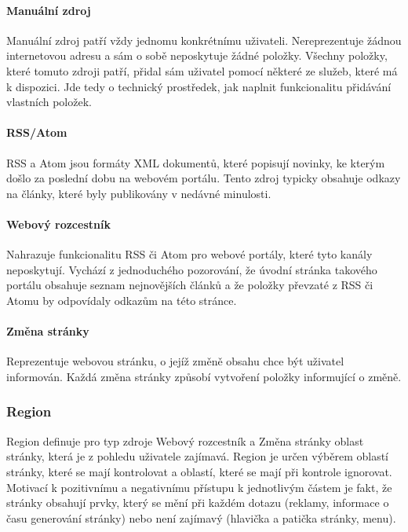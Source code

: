 \paragraph{Manuální zdroj}

Manuální zdroj patří vždy jednomu konkrétnímu uživateli.
Nereprezentuje žádnou internetovou adresu a sám o sobě neposkytuje žádné položky.
Všechny položky, které tomuto zdroji patří, přidal sám uživatel pomocí některé ze služeb, které má k dispozici.
Jde tedy o technický prostředek, jak naplnit funkcionalitu přidávání vlastních položek.

\paragraph{RSS/Atom}

RSS a Atom jsou formáty XML dokumentů, které popisují novinky, ke kterým došlo za poslední dobu na webovém portálu.
Tento zdroj typicky obsahuje odkazy na články, které byly publikovány v nedávné minulosti.

\paragraph{Webový rozcestník}

Nahrazuje funkcionalitu RSS či Atom pro webové portály, které tyto kanály neposkytují.
Vychází z jednoduchého pozorování, že úvodní stránka takového portálu obsahuje seznam nejnovějších článků a že položky převzaté z RSS či Atomu by odpovídaly odkazům na této stránce.

\paragraph{Změna stránky}

Reprezentuje webovou stránku, o jejíž změně obsahu chce být uživatel informován.
Každá změna stránky způsobí vytvoření položky informující o změně.

\subsubsection{Region}

Region definuje pro typ zdroje Webový rozcestník a Změna stránky oblast stránky, která je z pohledu uživatele zajímavá.
Region je určen výběrem oblastí stránky, které se mají kontrolovat a oblastí, které se mají při kontrole ignorovat.
Motivací k pozitivnímu a negativnímu přístupu k jednotlivým částem je fakt, že stránky obsahují prvky, který se mění při každém dotazu (reklamy, informace o času generování stránky) nebo není zajímavý (hlavička a patička stránky, menu).

